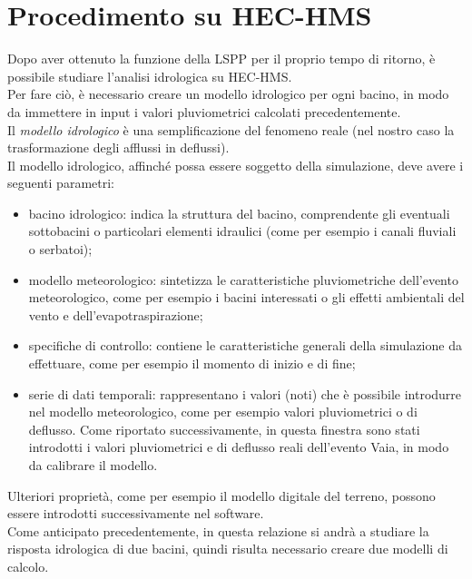 \section{Procedimento su HEC-HMS}
Dopo aver ottenuto la funzione della LSPP per il proprio tempo di ritorno, è possibile studiare l'analisi idrologica su HEC-HMS.\\
Per fare ciò, è necessario creare un modello idrologico per ogni bacino, in modo da immettere in input i valori pluviometrici calcolati precedentemente.\\
Il \textit{modello idrologico} è una semplificazione del fenomeno reale (nel nostro caso la trasformazione degli afflussi in deflussi).\\
Il modello idrologico, affinché possa essere soggetto della simulazione, deve avere i seguenti parametri:
\begin{itemize}
    \item bacino idrologico: indica la struttura del bacino, comprendente gli eventuali sottobacini o particolari elementi idraulici (come per esempio i canali fluviali o serbatoi);
    \item modello meteorologico: sintetizza le caratteristiche pluviometriche dell'evento meteorologico, come per esempio i bacini interessati o gli effetti ambientali del vento e dell'evapotraspirazione;
    \item specifiche di controllo: contiene le caratteristiche generali della simulazione da effettuare, come per esempio il momento di inizio e di fine;
    \item serie di dati temporali: rappresentano i valori (noti) che è possibile introdurre nel modello meteorologico, come per esempio valori pluviometrici o di deflusso. Come riportato successivamente, in questa finestra sono stati introdotti i valori pluviometrici e di deflusso reali dell'evento Vaia, in modo da calibrare il modello.
\end{itemize}
 Ulteriori proprietà, come per esempio il modello digitale del terreno, possono essere introdotti successivamente nel software.\\
 Come anticipato precedentemente, in questa relazione si andrà a studiare la risposta idrologica di due bacini, quindi risulta necessario creare due modelli di calcolo.

